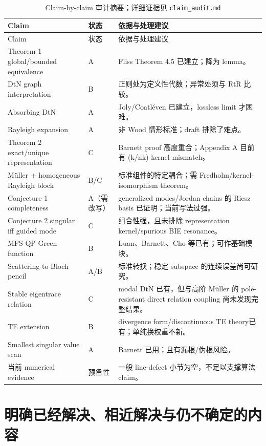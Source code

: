 \documentclass[UTF8,11pt,fontset=none]{ctexart}
\begin{document}
\begin{longtable}{p{} p{} p{}}
\caption{Claim-by-claim 审计摘要；详细证据见 \texttt{claim\_audit.md}}\\
\toprule
Claim & 状态 & 依据与处理建议 \\
\midrule
\endfirsthead
\toprule
Claim & 状态 & 依据与处理建议 \\
\midrule
\endhead
Theorem 1 global/bounded equivalence & A & Fliss Theorem 4.5 已建立；降为 lemma。\\
DtN graph interpretation & B & 正则处为定义性代数；异常处须与 RtR 比较。\\
Absorbing DtN & A & Joly/Coatléven 已建立，lossless limit 才困难。\\
Rayleigh expansion & A & 非 Wood 情形标准；draft 排除了难点。\\
Theorem 2 exact/unique representation & C & Barnett proof 高度重合；Appendix A 目前有 (k/nk) kernel mismatch。\\
Müller + homogeneous Rayleigh block & B/C & 标准组件的特定耦合；需 Fredholm/kernel-isomorphism theorem。\\
Conjecture 1 completeness & A（需改写） & generalized modes/Jordan chains 的 Riesz basis 已证明；当前写法过强。\\
Conjecture 2 singular iff guided mode & C & 组合性强，且未排除 representation kernel/spurious BIE resonance。\\
MFS QP Green function & B & Luan、Barnett、Cho 等已有；可作基础模块。\\
Scattering-to-Bloch pencil & A/B & 标准转换；稳定 subspace 的连续误差尚可研究。\\
Stable eigentrace relation & C & modal DtN 已有，但与高阶 Müller 的 pole-resistant direct relation coupling 尚未发现完整结果。\\
TE extension & B & divergence form/discontinuous TE theory已有；单纯换权重不新。\\
Smallest singular value scan & A & Barnett 已用；且有漏根/伪根风险。\\
当前 numerical evidence & 预备性 & 一般 line-defect 小节为空，不足以支撑算法 claim。\\
\bottomrule
\end{longtable}

\section{明确已经解决、相近解决与仍不确定的内容}
\end{document}

